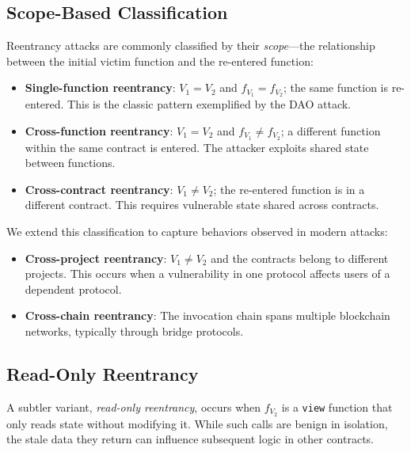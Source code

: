 \subsection{Scope-Based Classification}
\label{sec:bg-classification}

Reentrancy attacks are commonly classified by their \textit{scope}---the relationship between the initial victim function and the re-entered function:

\begin{itemize}
    \item \textbf{Single-function reentrancy}: $V_1 = V_2$ and $f_{V_1} = f_{V_2}$; the same function is re-entered. This is the classic pattern exemplified by the DAO attack.

    \item \textbf{Cross-function reentrancy}: $V_1 = V_2$ and $f_{V_1} \neq f_{V_2}$; a different function within the same contract is entered. The attacker exploits shared state between functions.

    \item \textbf{Cross-contract reentrancy}: $V_1 \neq V_2$; the re-entered function is in a different contract. This requires vulnerable state shared across contracts.
\end{itemize}

We extend this classification to capture behaviors observed in modern attacks:

\begin{itemize}
    \item \textbf{Cross-project reentrancy}: $V_1 \neq V_2$ and the contracts belong to different projects. This occurs when a vulnerability in one protocol affects users of a dependent protocol.

    \item \textbf{Cross-chain reentrancy}: The invocation chain spans multiple blockchain networks, typically through bridge protocols.
\end{itemize}

\subsection{Read-Only Reentrancy}

A subtler variant, \textit{read-only reentrancy}, occurs when $f_{V_2}$ is a \lstinline{view} function that only reads state without modifying it. While such calls are benign in isolation, the stale data they return can influence subsequent logic in other contracts.

